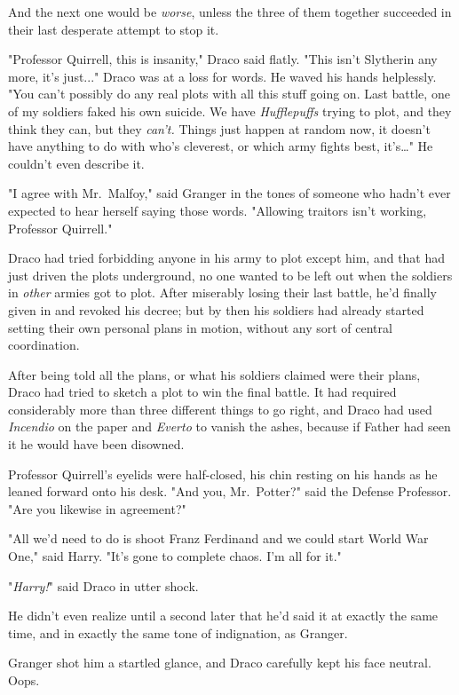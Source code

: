 And the next one would be \emph{worse}, unless the three of them together 
succeeded in their last desperate attempt to stop it.

"Professor Quirrell, this is insanity," Draco said flatly. "This isn't 
Slytherin any more, it's just..." Draco was at a loss for words. He 
waved his hands helplessly. "You can't possibly do any real plots with all this 
stuff going on. Last battle, one of my soldiers faked his own suicide. We have 
\emph{Hufflepuffs} trying to plot, and they think they can, but they 
\emph{can't.} Things just happen at random now, it doesn't have anything to do 
with who's cleverest, or which army fights best, it's{\ldots}" He couldn't even 
describe it.

"I agree with Mr.~Malfoy," said Granger in the tones of someone who hadn't ever 
expected to hear herself saying those words. "Allowing traitors isn't working, 
Professor Quirrell."

Draco had tried forbidding anyone in his army to plot except him, and that had 
just driven the plots underground, no one wanted to be left out when the 
soldiers in \emph{other} armies got to plot. After miserably losing their last 
battle, he'd finally given in and revoked his decree; but by then his soldiers 
had already started setting their own personal plans in motion, without any 
sort of central coordination.

After being told all the plans, or what his soldiers claimed were their plans, 
Draco had tried to sketch a plot to win the final battle. It had required 
considerably more than three different things to go right, and Draco had used 
\emph{Incendio} on the paper and \emph{Everto} to vanish the ashes, because if 
Father had seen it he would have been disowned.

Professor Quirrell's eyelids were half-closed, his chin resting on his hands as 
he leaned forward onto his desk. "And you, Mr.~Potter?" said the Defense 
Professor. "Are you likewise in agreement?"

"All we'd need to do is shoot Franz Ferdinand and we could start World War 
One," said Harry. "It's gone to complete chaos. I'm all for it."

"\emph{Harry!}" said Draco in utter shock.

He didn't even realize until a second later that he'd said it at exactly the 
same time, and in exactly the same tone of indignation, as Granger.

Granger shot him a startled glance, and Draco carefully kept his face neutral. 
Oops.

